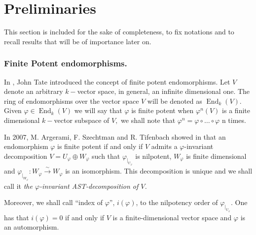 \documentclass[10pt,a4paper]{amsart}
\theoremstyle{plain}
\theoremstyle{remark}
\numberwithin{equation}{section} \numberwithin{defn}{section}
\newcommand\ed{\operatorname{End}}
\newcommand{\f}{\varphi}
\begin{document}
\section{Preliminaries} \label{S:pre}
This section is included for the sake of completeness, to fix notations and to recall results that will be of importance later on.
\subsubsection{Finite Potent endomorphisms.}\label{ss: FP endos}

In \cite{Ta}, John Tate introduced the concept of finite potent endomorphisms. Let $V$ denote an arbitrary $k-$vector space, in general, an infinite dimensional one. The ring of endomorphisms over the vector space $V$ will be denoted as $\ed_k(V).$ Given $\f \in \ed_k(V)$ we will say that $\f$ is finite potent when $\f^n (V)$ is a finite dimensional $k-$vector subspace of $V,$ we shall note that $\f^n=\f\circ \dots \circ \f$ n times. 

 In 2007, M. Argerami, F. Szechtman and R. Tifenbach showed in \cite{AST} that an endomorphism $\varphi$ is
finite potent if and only if $V$ admits a $\varphi$-invariant
decomposition $V = U_\varphi \oplus W_\varphi$ such that
$\varphi_{\vert_{U_\varphi}}$ is nilpotent, $W_\varphi$ is finite
dimensional and $\varphi_{\vert_{W_\varphi}} \colon W_\varphi
\overset \sim \longrightarrow W_\varphi$ is an isomorphism.
This decomposition is unique and we shall call it \textit{the $\varphi$-invariant AST-decomposition of $V$.}

Moreover,  we shall call ``index of $\varphi$'', $i(\varphi)$, to the nilpotency order of $\varphi_{\vert_{U_\varphi}}$.  One has that $i(\varphi) = 0$ if and only if $V$ is a finite-dimensional vector space and $\varphi$ is an automorphism.
\end{document}
